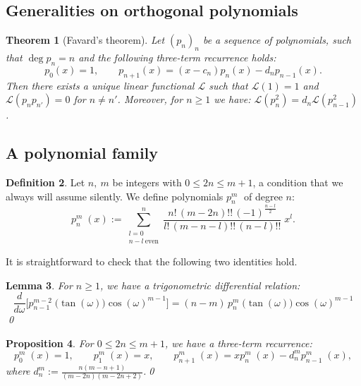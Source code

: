 \documentclass{amsart}
\newcommand{\p}[2]{p_{#1}^{#2}\;\!\!}
\renewcommand{\L}{\mathcal{L}}
\newcommand{\coloneqq}{:=}
\theoremstyle{plain}
\newtheorem{theorem}{Theorem}[section]
\newtheorem{lemma}[theorem]{Lemma}
\newtheorem{proposition}[theorem]{Proposition}
\theoremstyle{definition}
\newtheorem{definition}[theorem]{Definition}
\theoremstyle{remark}
\begin{document}
\subsection{Generalities on orthogonal polynomials}
\begin{theorem}[Favard's theorem] \label{favard}
Let $(p_n)_n$ be a sequence of polynomials, such that $\deg p_n =n$ and the following three-term recurrence holds:
$$p_0(x) = 1,\qquad  p_{n+1}(x) = (x-c_n)p_n(x) - d_np_{n-1}(x).
$$
Then there exists a unique linear functional $\L$ such that $\L(1)=1$ and $\L(p_np_{n'})=0$ for $n\neq n'$. Moreover, for $n\geq 1$ we have: $\L(p_n^2) = d_n\L(p_{n-1}^2)$.
\end{theorem}



\subsection{A polynomial family}
\begin{definition} Let $n,\ m$ be integers with $0\leq 2n\leq m+1$, a condition that we always will assume silently. We define polynomials $\p{n}{m}$ of degree $n$:
\begin{equation}
\p{n}{m}(x) \coloneqq \sum_{\substack{l=0\\ n-l\ \text{even}}}^n \frac{n!\,(m-2n)!!\,(-1)^{\frac{n-l}{2}}}{l!\,(m-n-l)!!\,(n-l)!!}\;x^l.
\end{equation}
\end{definition}
It is straightforward to check that the following two identities hold.
\begin{lemma} \label{trigonometric}
For $n\geq 1$, we have a trigonometric differential relation:
\begin{equation}
\frac{d}{d\omega} \Big[\p{n-1}{m-2}\big(\tan(\omega)\big)\cos(\omega)^{m-1} \Big]= (n-m)\, \p{n}{m}\big(\tan(\omega)\big)\cos(\omega)^{m-1}
\end{equation} \qed
\end{lemma}
\begin{proposition} \label{threeterm} For $0\leq 2n\leq m+1$, we have a three-term recurrence:
\begin{equation}
\p{0}{m}(x) = 1,\qquad \p{1}{m}(x) = x, \qquad \p{n+1}{m}(x) = x\p{n}{m}(x) -d_n^m \p{n-1}{m}(x),
\end{equation} 
where $d_n^m\coloneqq \frac{n(m-n+1)}{(m-2n)(m-2n+2)}$.\qed
\end{proposition}
\end{document}

